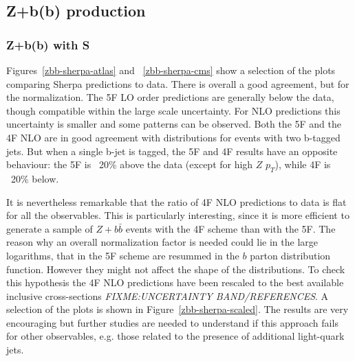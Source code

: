 \documentclass[11pt]{cernrep}
\newcommand{\Sherpa}{S\protect\scalebox{0.8}{HERPA}\xspace}
\newcommand{\pt}{\ensuremath{p_{T}}\xspace}
\begin{document}
\subsection{Z+b(b) production \label{Zbb}}

\subsubsection{Z+b(b) with \Sherpa}

Figures~\ref{zbb-sherpa-atlas} and ~\ref{zbb-sherpa-cms} show a selection of
the plots comparing Sherpa predictions to data.  There is overall a good
agreement, but for the normalization. The 5F LO order predictions are
generally below the data, though compatible within the large scale
uncertainty. For NLO predictions this uncertainty is smaller and some
patterns can be observed. Both the 5F and the 4F NLO are in good agreement
with distributions for events with two b-tagged jets.  But when a single
b-jet is tagged, the 5F and 4F results have an opposite behaviour: the 5F is
~20\% above the data (except for high $Z$ \pt), while 4F is ~20\% below.

It is nevertheless remarkable that the ratio of 4F NLO predictions to data is
flat for all the observables. This is particularly interesting, since it is
more efficient to generate a sample of $Z+b\bar{b}$ events with the 4F scheme
than with the 5F. The reason why an overall normalization factor is needed
could lie in the large logarithms, that in the 5F scheme are resummed in the
$b$ parton distribution function. However they might not affect the shape of
the distributions. To check this hypothesis the 4F NLO predictions have been
rescaled to the best available inclusive cross-sections {\em
  FIXME:UNCERTAINTY BAND/REFERENCES}. A selection of the plots is shown in
Figure~\ref{zbb-sherpa-scaled}. The results are very encouraging but further
studies are needed to understand if this approach fails for other
observables, e.g. those related to the presence of additional light-quark
jets.
\end{document}
